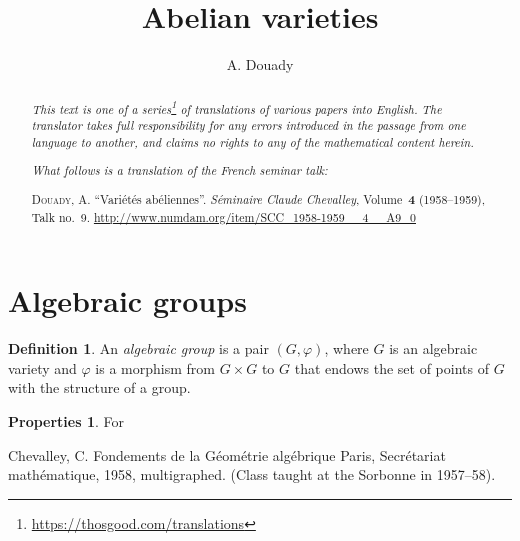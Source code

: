 \documentclass{article}
\title{Abelian varieties}
\author{A. Douady}
\date{}
\theoremstyle{plain}
\theoremstyle{definition}
\newtheorem*{definition*}{Definition}
\newtheorem*{properties*}{Properties}
\newcommand{\oldpage}[1]{\marginpar{\footnotesize$\Big\vert$ \textit{p.~#1}}}
\begin{document}
\maketitle
\thispagestyle{fancy}

\renewcommand{\abstractname}{Translator's note.}

\begin{abstract}
  \renewcommand*{\thefootnote}{\fnsymbol{footnote}}
  \emph{This text is one of a series\footnote{\url{https://thosgood.com/translations}} of translations of various papers into English.}
  \emph{The translator takes full responsibility for any errors introduced in the passage from one language to another, and claims no rights to any of the mathematical content herein.}

  \medskip
  
  \emph{What follows is a translation of the French seminar talk:}

  \medskip\noindent
  \textsc{Douady, A.}
  ``Vari\'{e}t\'{e}s ab\'{e}liennes''.
  \emph{S\'{e}minaire Claude Chevalley}, Volume~\textbf{4} (1958--1959), Talk no.~9.
  {\url{http://www.numdam.org/item/SCC_1958-1959__4__A9_0}}
\end{abstract}

\setcounter{footnote}{0}

\tableofcontents
\bigskip



\section{Algebraic groups}
\label{1}

\oldpage{9-01}
\begin{definition*}
  An \emph{algebraic group} is a pair $(G,\varphi)$, where $G$ is an algebraic variety and $\varphi$ is a morphism from $G\times G$ to $G$ that endows the set of points of $G$ with the structure of a group.
\end{definition*}

\begin{properties*}
  For
\end{properties*}



\nocite{*}

\begin{thebibliography}{1}

  {\sc Chevalley, C.}
  \newblock Fondements de la G\'{e}om\'{e}trie alg\'{e}brique
  \newblock Paris, Secr\'{e}tariat math\'{e}matique, 1958, multigraphed.
  \newblock (Class taught at the Sorbonne in 1957--58).

\end{thebibliography}
\end{document}
